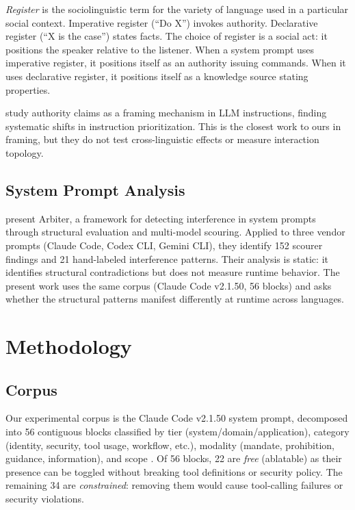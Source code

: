 \documentclass[11pt,a4paper]{article}
\begin{document}
\emph{Register} is the sociolinguistic term for the variety of
language used in a particular social context.
Imperative register (``Do X'') invokes authority. Declarative register
(``X is the case'') states facts. The choice of register is a social
act: it positions the speaker relative to the listener. When a
system prompt uses imperative register, it positions itself as an
authority issuing commands. When it uses declarative register, it
positions itself as a knowledge source stating properties.

\citet{pragmatic2025influence} study authority claims as a framing
mechanism in LLM instructions, finding systematic shifts in
instruction prioritization. This is the closest work to ours in
framing, but they do not test cross-linguistic effects or measure
interaction topology.

\subsection{System Prompt Analysis}

\citet{mason2026arbiter} present Arbiter, a framework for detecting
interference in system prompts through structural evaluation and
multi-model scouring. Applied to three vendor prompts (Claude Code,
Codex CLI, Gemini CLI), they identify 152 scourer findings and 21
hand-labeled interference patterns. Their analysis is static: it
identifies structural contradictions but does not measure runtime
behavior. The present work uses the same corpus (Claude Code v2.1.50,
56 blocks) and asks whether the structural patterns manifest
differently at runtime across languages.

\section{Methodology}
\label{sec:methodology}

\subsection{Corpus}

Our experimental corpus is the Claude Code v2.1.50 system prompt,
decomposed into 56 contiguous blocks classified by tier
(system/domain/application), category (identity, security, tool usage,
workflow, etc.), modality (mandate, prohibition, guidance,
information), and scope \citep{mason2026arbiter}. Of 56 blocks,
22 are \emph{free} (ablatable) as their presence can be toggled
without breaking tool definitions or security policy. The remaining
34 are \emph{constrained}: removing them would cause tool-calling
failures or security violations.
\end{document}
